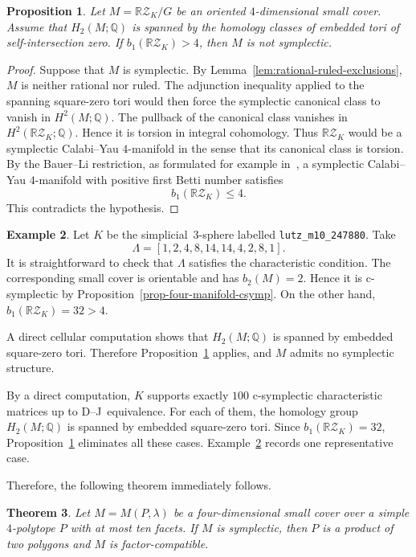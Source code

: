 \documentclass{amsart}
\newtheorem{theorem}{Theorem}[section]
\newtheorem{proposition}[theorem]{Proposition}
\numberwithin{equation}{section}
\theoremstyle{definition}
\newtheorem{example}[theorem]{Example}
\theoremstyle{remark}
\newcommand{\Q}{\mathbb Q}
\newcommand{\RZ}{\mathbb R\mathcal Z}
\begin{document}
\begin{proposition}\label{prop-adjunction-virtual-betti}
    Let $M = \RZ_K/G$ be an oriented $4$-dimensional small cover.
    Assume that $H_2(M;\Q)$ is spanned by the homology classes of embedded tori of self-intersection zero.    
    If $b_1(\RZ_K)>4$, then $M$ is not symplectic.
\end{proposition}
\begin{proof}
    Suppose that $M$ is symplectic.
    By Lemma~\ref{lem:rational-ruled-exclusions}, $M$ is neither rational nor ruled.
    The adjunction inequality applied to the spanning square-zero tori would then force the symplectic canonical class to vanish in $H^2(M;\Q)$.
    The pullback of the canonical class vanishes in $H^2(\RZ_K;\Q)$.
    Hence it is torsion in integral cohomology.
    Thus $\RZ_K$ would be a symplectic Calabi--Yau $4$-manifold in the sense that its canonical class is torsion.
    By the Bauer--Li restriction, as formulated for example in~\cite{Friedl-Vidussi2013}, a symplectic Calabi--Yau $4$-manifold with positive first Betti number satisfies
    $$
        b_1(\RZ_K)\le 4.
    $$
    This contradicts the hypothesis.
\end{proof}
\begin{example}\label{ex-virtual-betti}
    Let $K$ be the simplicial~$3$-sphere labelled \texttt{lutz\_m10\_247880}.
    Take
    $$
        \Lambda=[1,2,4,8,14,14,4,2,8,1].
    $$
    It is straightforward to check that $\Lambda$ satisfies the characteristic condition.
    The corresponding small cover is orientable and has $b_2(M)=2$. 
    Hence it is c-symplectic by Proposition~\ref{prop-four-manifold-csymp}.
    On the other hand, $b_1(\RZ_K)=32>4$.
    
    A direct cellular computation shows that $H_2(M;\Q)$ is spanned by embedded square-zero tori.
    Therefore Proposition~\ref{prop-adjunction-virtual-betti} applies, and $M$ admits no symplectic structure.
\end{example}


By a direct computation, $K$ supports exactly $100$ c-symplectic characteristic matrices up to D--J~equivalence.
For each of them, the homology group $H_2(M;\Q)$ is spanned by embedded square-zero tori.
Since $b_1(\RZ_K)=32$, Proposition~\ref{prop-adjunction-virtual-betti} eliminates all these cases.
Example~\ref{ex-virtual-betti} records one representative case.

Therefore, the following theorem immediately follows.
\begin{theorem}\label{thm-up-to-ten-factor-compatible}
    Let $M=M(P,\lambda)$ be a four-dimensional small cover over a simple $4$-polytope $P$ with at most ten facets.
    If $M$ is symplectic, then $P$ is a product of two polygons and $M$ is factor-compatible.
\end{theorem}
\end{document}

